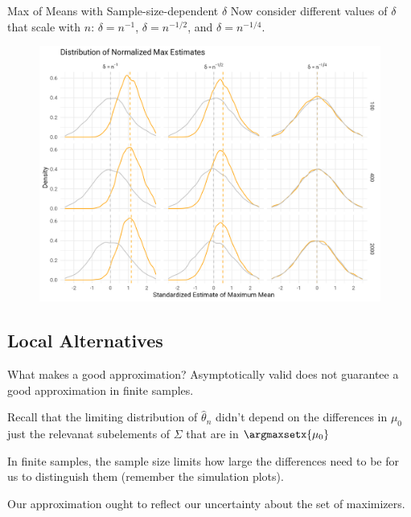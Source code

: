 \documentclass[aspectratio=169, professionalfonts]{beamer}
\begin{document}
\begin{frame}{Max of Means with Sample-size-dependent $\delta$}
	Now consider different values of $\delta$ that scale with $n$: $\delta = n^{-1}$,
	$\delta = n^{-1/2}$, and $\delta = n^{-1/4}$.
\end{frame}

\begin{frame}
	\begin{figure}
		\includegraphics[width=.9\textwidth]{figures/max_means_sim_plot}
	\end{figure}
\end{frame}
\subsection{Local Alternatives}
\begin{frame}{What makes a good approximation?}
	Asymptotically valid does not guarantee a good approximation in finite
	samples.

	\vfill


	Recall that the limiting distribution of $\widehat{\theta}_n$ didn't depend on
	the differences in $\mu_0$ just the relevanat subelements of $\Sigma$ that are in $\argmaxsetx{\mu_0}$


	\vfill
	In finite samples, the sample size limits how large the differences
	need to be for us to distinguish them (remember the simulation plots).

	\vfill

	Our approximation ought to reflect our uncertainty about the set
	of 	maximizers.

\end{frame}
\end{document}
